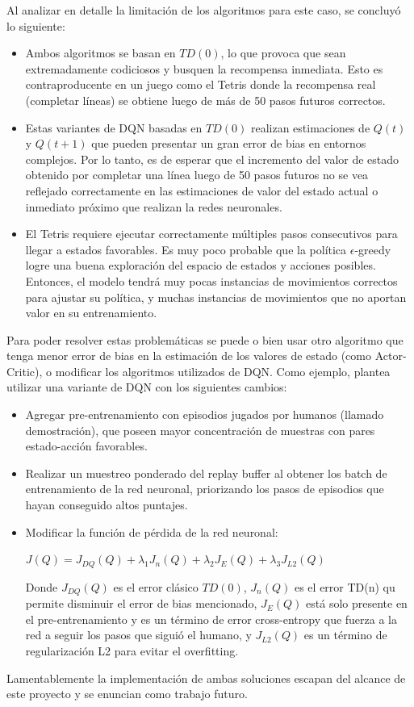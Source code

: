 Al analizar en detalle la limitación de los algoritmos para este caso, se concluyó lo siguiente:
\begin{itemize}
    \item Ambos algoritmos se basan en \(TD(0)\), lo que provoca que sean extremadamente codiciosos y busquen la recompensa inmediata. Esto es contraproducente en un juego como el Tetris donde la recompensa real (completar líneas) se obtiene luego de más de 50 pasos futuros correctos. 
    \item Estas variantes de DQN basadas en \(TD(0)\) realizan estimaciones de \(Q(t)\) y \(Q(t+1)\) que pueden presentar un gran error de bias en entornos complejos. Por lo tanto, es de esperar que el incremento del valor de estado obtenido por completar una línea luego de 50 pasos futuros no se vea reflejado correctamente en las estimaciones de valor del estado actual o inmediato próximo que realizan la redes neuronales.
    \item El Tetris requiere ejecutar correctamente múltiples pasos consecutivos para llegar a estados favorables. Es muy poco probable que la política \(\epsilon\)-greedy logre una buena exploración del espacio de estados y acciones posibles. Entonces, el modelo tendrá muy pocas instancias de movimientos correctos para ajustar su política, y muchas instancias de movimientos que no aportan valor en su entrenamiento.
\end{itemize}
Para poder resolver estas problemáticas se puede o bien usar otro algoritmo que tenga menor error de bias en la estimación de los valores de estado (como Actor-Critic), o modificar los algoritmos utilizados de DQN. Como ejemplo, \citep{ARTICLE:1} plantea utilizar una variante de DQN con los siguientes cambios:
\begin{itemize}
    \item Agregar pre-entrenamiento con episodios jugados por humanos (llamado demostración), que poseen mayor concentración de muestras con pares estado-acción favorables.
    \item Realizar un muestreo ponderado del replay buffer al obtener los batch de entrenamiento de la red neuronal, priorizando los pasos de episodios que hayan conseguido altos puntajes. 
    \item Modificar la función de pérdida de la red neuronal:
    
    \(J(Q) = J_{DQ}(Q) + \lambda_1 J_n(Q) + \lambda_2 J_E(Q) + \lambda_3 J_{L2}(Q) \)
    
    Donde \(J_{DQ}(Q)\) es el error clásico \(TD(0)\), \(J_n(Q)\) es el error TD(n) qu permite disminuir el error de bias mencionado, \(J_E(Q)\) está solo presente en el pre-entrenamiento y es un término de error cross-entropy que fuerza a la red a seguir los pasos que siguió el humano, y  \(J_{L2}(Q)\) es un término de regularización L2 para evitar el overfitting.
\end{itemize}
Lamentablemente la implementación de ambas soluciones escapan del alcance de este proyecto y se enuncian como trabajo futuro.

